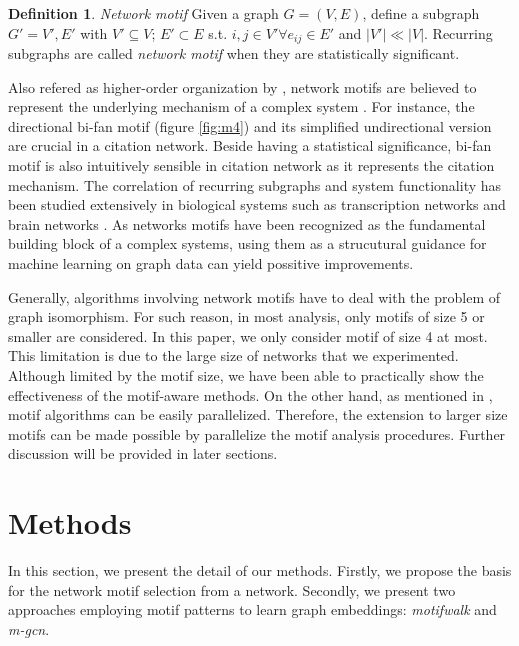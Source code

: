 \documentclass{article}
\theoremstyle{definition}
\newtheorem{definition}{Definition}[section]
\begin{document}
\begin{definition}{\emph{Network motif}}
Given a graph $G = (V,E)$, define a subgraph $G' = {V', E'}$ with $V' \subseteq V$;
$E' \subset E$ s.t. $i,j \in V' \forall e_{ij} \in E'$ and $|V'| \ll |V|$. Recurring subgraphs
are called \emph{network motif} when they are statistically significant.
\end{definition}

Also refered as higher-order organization by \citeauthor{juremotif}, network motifs
are believed to represent the underlying mechanism of a complex system 
\cite{netmotif,alon2006introduction,mangan2003structure}. 
For instance, the directional bi-fan motif (figure \ref{fig:m4})
and its simplified undirectional version are crucial in a citation network. 
Beside having a statistical significance, bi-fan motif is also intuitively 
sensible in citation network as it represents the citation mechanism. 
The correlation of recurring subgraphs and system functionality has 
been studied extensively in biological systems such as 
transcription networks \cite{mangan2003structure} and brain 
networks \cite{brainnetheuvel,honey2007network}. As networks motifs
have been recognized as the fundamental building block of a complex
systems, using them as a strucutural guidance for machine learning
on graph data can yield possitive improvements.

Generally, algorithms involving network motifs have to deal with
the problem of graph isomorphism. For such reason, in most analysis,
only motifs of size 5 or smaller are considered. In this paper,
we only consider motif of size 4 at most. This limitation is due to
the large size of networks that we experimented. Although limited 
by the motif size, we have been able to practically show the effectiveness of
the motif-aware methods. On the other hand, as mentioned in \cite{juremotif},
motif algorithms can be easily parallelized. Therefore, the extension to
larger size motifs can be made possible by parallelize the motif
analysis procedures. Further discussion will be provided in later sections.

\section{Methods}

In this section, we present the detail of our methods. Firstly,
we propose the basis for the network motif selection from a network.
Secondly, we present two approaches employing motif patterns to
learn graph embeddings: \emph{motifwalk} and \emph{m-gcn}.
\end{document}
